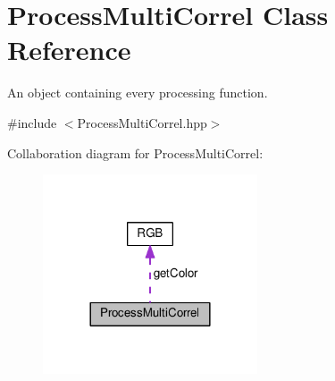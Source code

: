 \hypertarget{class_process_multi_correl}{}\section{Process\+Multi\+Correl Class Reference}
\label{class_process_multi_correl}


An object containing every processing function.  




{\ttfamily \#include $<$Process\+Multi\+Correl.\+hpp$>$}



Collaboration diagram for Process\+Multi\+Correl\+:
\nopagebreak
\begin{figure}[H]
\begin{center}
\leavevmode
\includegraphics[width=180pt]{class_process_multi_correl__coll__graph}
\end{center}
\end{figure}
